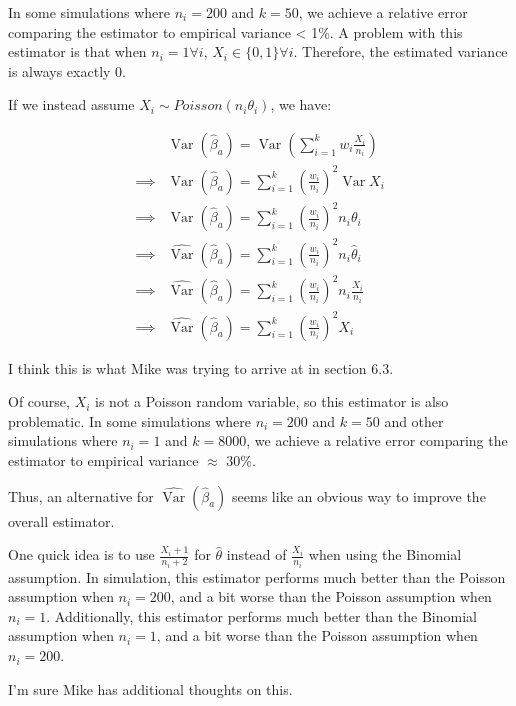 \documentclass{article}
\DeclareMathOperator{\Var}{Var}
\begin{document}
In some simulations where \( n_i = 200 \) and \( k = 50 \), we achieve a relative error comparing the estimator to empirical variance < 1\%.
A problem with this estimator is that when \( n_i = 1 \forall i\), \( X_i \in \{0, 1 \} \forall i \). Therefore, the estimated variance is always exactly 0.

\pagebreak

If we instead assume \( X_i \sim Poisson(n_i \theta_i) \), we have:

\begin{align*}
	        &   \Var \left( \hat{\beta}_a \right)   =  \Var \left( \sum_{i=1}^k w_i \frac{X_i}{n_i}\right)\\
	\implies&   \Var \left( \hat{\beta}_a \right)   =  \sum_{i=1}^k \left( \frac{w_i}{n_i} \right)^2 \Var X_i \\
	\implies&   \Var \left( \hat{\beta}_a \right)   =  \sum_{i=1}^k \left( \frac{w_i}{n_i} \right)^2 n_i \theta_i \\
	\implies&   \widehat{\Var} \left( \hat{\beta}_a \right)   =  \sum_{i=1}^k \left( \frac{w_i}{n_i} \right)^2 n_i \hat{\theta}_i \\
	\implies&   \widehat{\Var} \left( \hat{\beta}_a \right)   =  \sum_{i=1}^k \left( \frac{w_i}{n_i} \right)^2 n_i \frac{X_i}{n_i} \\
	\implies&   \widehat{\Var} \left( \hat{\beta}_a \right)   =  \sum_{i=1}^k \left( \frac{w_i}{n_i} \right)^2 X_i
\end{align*}

I think this is what Mike was trying to arrive at in section 6.3.

Of course, \(X_i \) is not a Poisson random variable, so this estimator is also problematic.
In some simulations where \( n_i = 200 \) and \( k = 50 \) and other simulations where \( n_i = 1 \) and \( k = 8000 \), we achieve a relative error comparing the estimator to empirical variance \( \approx \) 30\%.

Thus, an alternative for  \( \widehat{\Var} \left( \hat{\beta}_a \right) \) seems like an obvious way to improve the overall estimator.

One quick idea is to use \( \frac{X_i + 1}{n_i + 2} \) for \( \hat{\theta} \) instead of \( \frac{X_i}{n_i} \) when using the Binomial assumption.
In simulation, this estimator performs much better than the Poisson assumption when \( n_i = 200 \), and a bit worse than the Poisson assumption when \( n_i = 1 \).
Additionally, this estimator performs  much better than the Binomial assumption when \( n_i = 1 \), and a bit worse than the Poisson assumption when \( n_i = 200 \).

I'm sure Mike has additional thoughts on this.

%




\end{document}
